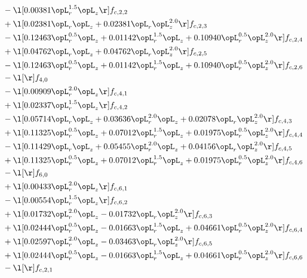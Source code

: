 \begin{alignat}{2}
& - \l[  0.00381 \opL_r^{1.5} \opL_z  \r] f_{c,2,2} \nonumber \\ 
& + \l[  0.02381 \opL_r \opL_z +  0.02381 \opL_r \opL_z^{2.0}  \r] f_{c,2,3} \nonumber \\ 
& - \l[  0.12463 \opL_r^{0.5} \opL_z +  0.01142 \opL_r^{1.5} \opL_z +  0.10940 \opL_r^{0.5} \opL_z^{2.0}  \r] f_{c,2,4} \nonumber \\ 
& + \l[  0.04762 \opL_r \opL_z +  0.04762 \opL_r \opL_z^{2.0}  \r] f_{c,2,5} \nonumber \\ 
& - \l[  0.12463 \opL_r^{0.5} \opL_z +  0.01142 \opL_r^{1.5} \opL_z +  0.10940 \opL_r^{0.5} \opL_z^{2.0}  \r] f_{c,2,6} \nonumber \\ 
& - \l[  \r] f_{4,0} \nonumber \\ 
& - \l[  0.00909 \opL_r^{2.0} \opL_z  \r] f_{c,4,1} \nonumber \\ 
& + \l[  0.02337 \opL_r^{1.5} \opL_z  \r] f_{c,4,2} \nonumber \\ 
& - \l[  0.05714 \opL_r \opL_z +  0.03636 \opL_r^{2.0} \opL_z +  0.02078 \opL_r \opL_z^{2.0}  \r] f_{c,4,3} \nonumber \\ 
& + \l[  0.11325 \opL_r^{0.5} \opL_z +  0.07012 \opL_r^{1.5} \opL_z +  0.01975 \opL_r^{0.5} \opL_z^{2.0}  \r] f_{c,4,4} \nonumber \\ 
& - \l[  0.11429 \opL_r \opL_z +  0.05455 \opL_r^{2.0} \opL_z +  0.04156 \opL_r \opL_z^{2.0}  \r] f_{c,4,5} \nonumber \\ 
& + \l[  0.11325 \opL_r^{0.5} \opL_z +  0.07012 \opL_r^{1.5} \opL_z +  0.01975 \opL_r^{0.5} \opL_z^{2.0}  \r] f_{c,4,6} \nonumber \\ 
& - \l[  \r] f_{6,0} \nonumber \\ 
& + \l[  0.00433 \opL_r^{2.0} \opL_z  \r] f_{c,6,1} \nonumber \\ 
& - \l[  0.00554 \opL_r^{1.5} \opL_z  \r] f_{c,6,2} \nonumber \\ 
& + \l[  0.01732 \opL_r^{2.0} \opL_z   -0.01732 \opL_r \opL_z^{2.0}  \r] f_{c,6,3} \nonumber \\ 
& + \l[  0.02444 \opL_r^{0.5} \opL_z   -0.01663 \opL_r^{1.5} \opL_z +  0.04661 \opL_r^{0.5} \opL_z^{2.0}  \r] f_{c,6,4} \nonumber \\ 
& + \l[  0.02597 \opL_r^{2.0} \opL_z   -0.03463 \opL_r \opL_z^{2.0}  \r] f_{c,6,5} \nonumber \\ 
& + \l[  0.02444 \opL_r^{0.5} \opL_z   -0.01663 \opL_r^{1.5} \opL_z +  0.04661 \opL_r^{0.5} \opL_z^{2.0}  \r] f_{c,6,6} \nonumber \\ 
& - \l[  \r] f_{c,2,1} \nonumber \\ 
\end{alignat} 


